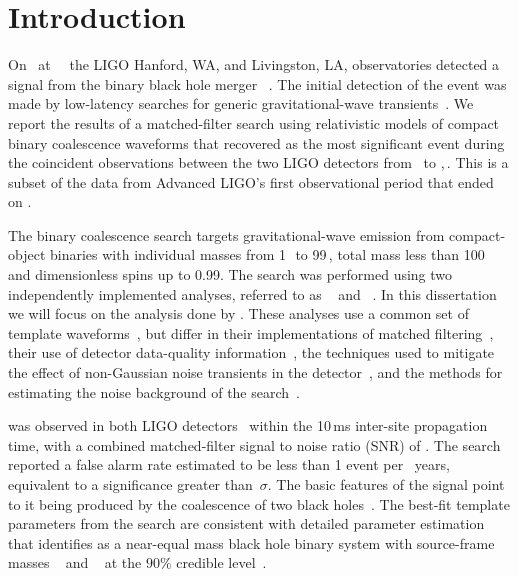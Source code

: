 
\section{Introduction}
\label{s:intro}
On \OBSEVENTDATEMONTHDAYYEAR\ at \OBSEVENTTIME ~\OBSEVENTTZ\ the LIGO Hanford,
WA, and Livingston, LA, observatories detected a signal from the binary black
hole merger \TheEvent{}~\cite{GW150914-DETECTION}.  The initial detection of
the event was made by low-latency searches for generic gravitational-wave
transients~\cite{GW150914-BURST}. We report the results of a matched-filter
search using relativistic models of compact binary coalescence waveforms that
recovered \TheEvent{} as the most significant event during the coincident
observations between the two LIGO detectors from \OBSSTART\ to
\OBSEND,\,\OBSYEAR. This is a subset of the data from Advanced LIGO's first
observational period that ended on \OoneEND. 

The binary coalescence search targets gravitational-wave emission from
compact-object binaries with individual masses from 1$\,$\Msun\, to
99$\,$\Msun, total mass less than 100$\,$\Msun\, and dimensionless spins up to
0.99. The search was performed using two independently implemented analyses,
referred to as \pycbc{}~\cite{Canton:2014ena,Usman:2015kfa,pycbc-github} and
\gstlal{}~\cite{Cannon:2011vi,Privitera:2013xza,gstlal-methods}.  In this
dissertation we will focus on the analysis done by \pycbc{}. These
analyses use a common set of template
waveforms~\cite{Taracchini:2013rva,Purrer:2015tud,Capano:2016uif}, but differ
in their implementations of matched
filtering~\cite{Allen:2005fk,Cannon:2010qh}, their use of detector
data-quality information~\cite{GW150914-DETCHAR}, the techniques used to
mitigate the effect of non-Gaussian noise transients in the
detector~\cite{Allen:2004gu,Cannon:2011vi}, and the methods for estimating the
noise background of the search~\cite{Usman:2015kfa,Cannon:2015gha}.  

\TheEvent{} was observed in both LIGO detectors~\cite{GW150914-DETECTORS}
within the 10\,ms inter-site propagation time, with a combined matched-filter
signal to noise ratio (SNR) of \OBSEVENTAPPROXCOMBINEDSNR.  The search
reported a false alarm rate estimated to be less than 1 event per
\CBCEVENTIFAR~years, equivalent to a significance greater than
\CBCEVENTSIGMA\,$\sigma$.  The basic features of the \TheEvent{} signal point
to it being produced by the coalescence of two black
holes~\cite{GW150914-DETECTION}.  The best-fit template parameters from the
search are consistent with detailed parameter estimation that identifies
\TheEvent{} as a near-equal mass black hole binary system with source-frame
masses {\MONESCOMPACT~\Msun} and {\MTWOSCOMPACT~\Msun} at the $90\%$ credible
level~\cite{GW150914-PARAMESTIM}.

